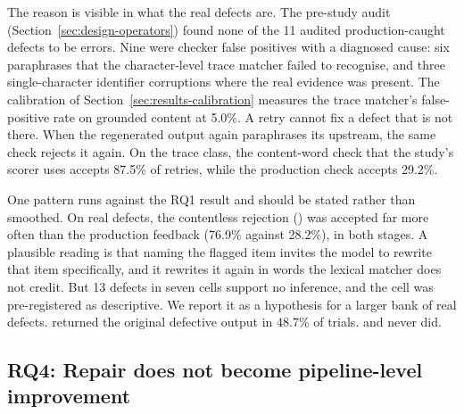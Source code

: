 The reason is visible in what the real defects are. The pre-study audit
(Section~\ref{sec:design-operators}) found none of the 11 audited production-caught
defects to be errors. Nine were
checker false positives with a diagnosed cause: six paraphrases that the
character-level trace matcher failed to recognise, and three single-character
identifier corruptions where the real evidence was present. The calibration of
Section~\ref{sec:results-calibration} measures the trace matcher's
false-positive rate on grounded content at 5.0\%. A retry cannot fix a defect
that is not there. When the regenerated output again paraphrases its upstream,
the same check rejects it again. On the trace class, the content-word check
that the study's scorer uses accepts 87.5\% of  retries, while the
production check accepts 29.2\%.

One pattern runs against the RQ1 result and should be stated rather than
smoothed. On real defects, the contentless rejection () was accepted far
more often than the production feedback (76.9\% against 28.2\%), in both
stages. A plausible reading is that naming the flagged item invites the model
to rewrite that item specifically, and it rewrites it again in words the
lexical matcher does not credit. But 13 defects in seven cells support no
inference, and the cell was pre-registered as descriptive. We report it as a
hypothesis for a larger bank of real defects.  returned the original
defective output in 48.7\% of trials.  and  never did.

\subsection{RQ4: Repair does not become pipeline-level improvement}
\label{sec:results-rq4}

